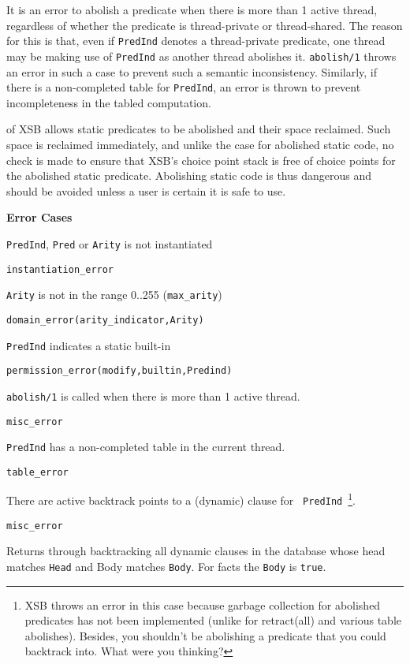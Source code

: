 \begin{description}
It is an error to abolish a predicate when there is more than 1 active
thread, regardless of whether the predicate is thread-private or
thread-shared.  The reason for this is that, even if {\tt PredInd}
denotes a thread-private predicate, one thread may be making use of
{\tt PredInd} as another thread abolishes it.  {\tt abolish/1} throws
an error in such a case to prevent such a semantic inconsistency.
Similarly, if there is a non-completed table for {\tt PredInd}, an
error is thrown to prevent incompleteness in the tabled computation.

\compatability \version{} of XSB allows static predicates to be
abolished and their space reclaimed.  Such space is reclaimed
immediately, and unlike the case for abolished static code,  no check
is made to ensure that XSB's choice point stack is free of choice
points for the abolished static predicate.  Abolishing static code is
thus dangerous and should be avoided unless a user is certain it is
safe to use.

{\bf Error Cases}
\bi
\item 	{\tt PredInd}, {\tt Pred} or {\tt Arity} is not instantiated
\bi
\item 	{\tt instantiation\_error}
\ei
%
\item 	{\tt Arity} is not in the range 0..255 ({\tt max\_arity})
\bi
\item 	{\tt domain\_error(arity\_indicator,Arity)}
\ei
%
\item 	{\tt PredInd} indicates a static built-in
\bi
\item 	{\tt permission\_error(modify,builtin,Predind)}
\ei
%
\item {\tt abolish/1} is called when there is more than 1 active thread.
\bi
\item {\tt misc\_error}
\ei
%
\item {\tt PredInd} has a non-completed table in the current thread.
\bi
\item {\tt table\_error}
\ei
%
\item There are active backtrack points to a (dynamic) clause for {\tt
  PredInd}~\footnote{XSB throws an error in this case because garbage
  collection for abolished predicates has not been implemented
  (unlike for retract(all) and various table abolishes).  Besides, you
  shouldn't be abolishing a predicate that you could backtrack into.
  What were you thinking?}. 
\bi
\item {\tt misc\_error}
\ei
%
\ei

Returns through backtracking all dynamic clauses in the database whose head
matches {\tt Head} and Body matches {\tt Body}.  For facts the {\tt Body} is
{\tt true}.  


\end{description}
